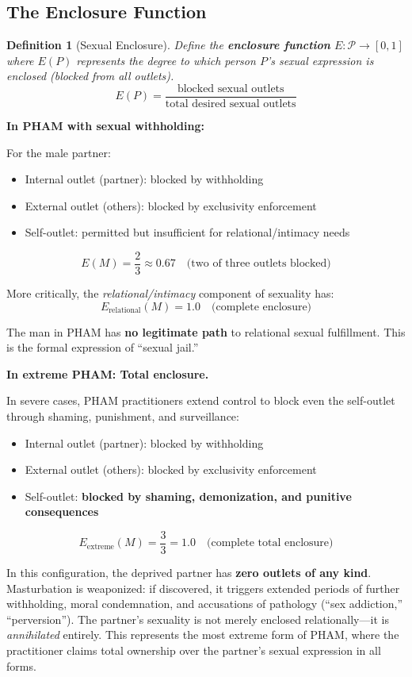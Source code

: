 \documentclass[12pt, letterpaper]{article}
\newtheorem{definition}{Definition}[section]
\begin{document}
\subsection{The Enclosure Function}

\begin{definition}[Sexual Enclosure]
Define the \textbf{enclosure function} $E: \mathcal{P} \rightarrow [0,1]$ where $E(P)$ represents the degree to which person $P$'s sexual expression is enclosed (blocked from all outlets).
\[
E(P) = \frac{\text{blocked sexual outlets}}{\text{total desired sexual outlets}}
\]
\end{definition}

\textbf{In PHAM with sexual withholding:}

For the male partner:
\begin{itemize}
    \item Internal outlet (partner): blocked by withholding
    \item External outlet (others): blocked by exclusivity enforcement
    \item Self-outlet: permitted but insufficient for relational/intimacy needs
\end{itemize}

\[
E(M) = \frac{2}{3} \approx 0.67 \quad \text{(two of three outlets blocked)}
\]

More critically, the \textit{relational/intimacy} component of sexuality has:
\[
E_{\text{relational}}(M) = 1.0 \quad \text{(complete enclosure)}
\]

The man in PHAM has \textbf{no legitimate path} to relational sexual fulfillment. This is the formal expression of ``sexual jail.''

\textbf{In extreme PHAM: Total enclosure.}

In severe cases, PHAM practitioners extend control to block even the self-outlet through shaming, punishment, and surveillance:
\begin{itemize}
    \item Internal outlet (partner): blocked by withholding
    \item External outlet (others): blocked by exclusivity enforcement
    \item Self-outlet: \textbf{blocked by shaming, demonization, and punitive consequences}
\end{itemize}

\[
E_{\text{extreme}}(M) = \frac{3}{3} = 1.0 \quad \text{(complete total enclosure)}
\]

In this configuration, the deprived partner has \textbf{zero outlets of any kind}. Masturbation is weaponized: if discovered, it triggers extended periods of further withholding, moral condemnation, and accusations of pathology (``sex addiction,'' ``perversion''). The partner's sexuality is not merely enclosed relationally---it is \textit{annihilated} entirely. This represents the most extreme form of PHAM, where the practitioner claims total ownership over the partner's sexual expression in all forms.
\end{document}
